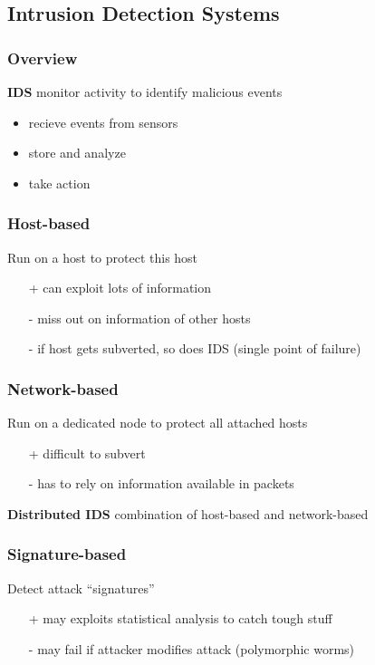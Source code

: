 \documentclass[]{article}
\theoremstyle{definition}
\begin{document}
	\subsection{Intrusion Detection Systems}
	\subsubsection{Overview}
	\textbf{IDS} monitor activity to identify malicious events
	\begin{itemize}
		\item recieve events from sensors
		\item store and analyze
		\item take action
	\end{itemize}

	\subsubsection{Host-based}
	Run on a host to protect this host
	\begin{itemize}
		\item[+] can exploit lots of information
		\item[-] miss out on information of other hosts
		\item[-] if host gets subverted, so does IDS (single point of failure)
	\end{itemize}

	\subsubsection{Network-based}
	Run on a dedicated node to protect all attached hosts
	\begin{itemize}
		\item[+] difficult to subvert
		\item[-] has to rely on information available in packets
	\end{itemize}
	\textbf{Distributed IDS} combination of host-based and network-based

	\subsubsection{Signature-based}
	Detect attack ``signatures''
	\begin{itemize}
		\item[+] may exploits statistical analysis to catch tough stuff
		\item[-] may fail if attacker modifies attack (polymorphic worms)
	\end{itemize}
\end{document}
